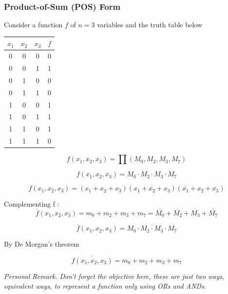 \documentclass[12pt,openany]{book}
\begin{document}
			      	\subsubsection{Product-of-Sum (POS) Form}
			      	Consider a function \( f \) of \( n = 3 \) variables and the truth table below
			      	\begin{center}
			      		\begin{tabular}{ccc|c}
			      			\( x_1 \) & \( x_2 \) & \( x_3 \) & \( f \) \\
			      			\hline
			      			0         & 0         & 0         & 0       \\
			      			0         & 0         & 1         & 1       \\
			      			0         & 1         & 0         & 0       \\
			      			0         & 1         & 1         & 0       \\
			      			1         & 0         & 0         & 1       \\
			      			1         & 0         & 1         & 1       \\
			      			1         & 1         & 0         & 1       \\
			      			1         & 1         & 1         & 0       \\
			      		\end{tabular}
			      	\end{center}
			      	\[
			      		f(x_1, x_2, x_3) = \prod (M_0, M_2, M_3, M_7)
			      	\]
			      	
			      	\[
			      		f(x_1, x_2, x_3) = M_0 \cdot M_2 \cdot M_3 \cdot M_7
			      	\]
			      	
			      	\[
			      		f(x_1, x_2, x_3) = (x_1 + x_2 + x_3)(x_1 + \overline{x_2} + x_3)(\overline{x_1} + x_2 + \overline{x_3})
			      	\]
			      	
			      	
			      	Complementing f :
			      	\[
			      		\overline{f}(x_1, x_2, x_3) = m_0 + m_2 + m_3 + m_7 = \overline{M_0} + \overline{M_2} + \overline{M_3} + \overline{M_7}
			      	\]
			      	
			      	\[
			      		\overline{f}(x_1, x_2, x_3) = \overline{M_0 \cdot M_2 \cdot M_3 \cdot M_7}
			      	\]
			      	
			      	By De Morgan's theorem
			      	
			      	\[
			      		\overline{f(x_1, x_2, x_3)} = m_0 + m_2 + m_3 + m_7
			      	\]
			      	
			      	\textit{Personal Remark. Don't forget the objective here, these are just two ways, equivalent ways, to represent a function only using ORs and ANDs.}
			      	
\end{document}
